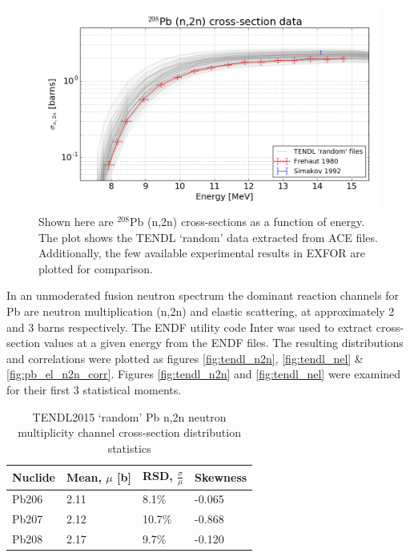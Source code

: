 \begin{figure}
  \centering
  \includegraphics[width=\textwidth]{pb208_n2n_tendl_exfor.png}
  \caption{Shown here are $^{208}$Pb (n,2n) cross-sections as a function of energy. The plot shows the TENDL `random' data extracted from ACE files. Additionally, the few available experimental results in EXFOR are plotted for comparison.}
  \label{fig:tendl_lead}
\end{figure}

In an unmoderated fusion neutron spectrum the dominant reaction channels for Pb are neutron multiplication (n,2n) and elastic scattering, at approximately 2 and 3 barns respectively. The ENDF utility code Inter was used to extract cross-section values at a given energy from the ENDF files. The resulting distributions and correlations were plotted as figures \ref{fig:tendl_n2n}, \ref{fig:tendl_nel} \& \ref{fig:pb_el_n2n_corr}. Figures \ref{fig:tendl_n2n} and \ref{fig:tendl_nel} were examined for their first 3 statistical moments. 

\begin{table}[ht]
  \footnotesize
  \centering 
  \begin{tabular}{llll}
    \toprule
    Nuclide & Mean, $\mu$ [b] & RSD, $\frac{\sigma}{\mu}$ & Skewness \\
    \midrule
    Pb206 & 2.11 & 8.1\% & -0.065 \\
    Pb207 & 2.12 & 10.7\% & -0.868 \\
    Pb208 & 2.17 & 9.7\% & -0.120 \\
    \bottomrule
  \end{tabular}
  \caption{TENDL2015 `random' Pb n,2n neutron multiplicity channel cross-section distribution statistics}
  \label{table:n2n} %
\end{table}


